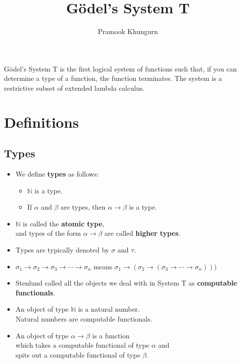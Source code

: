 \documentclass[10pt]{article}
\title{G\"odel's System T}
\author{Pramook Khungurn}
\begin{document}
	\maketitle
	
	G\"odel's System T is the first logical system of functions such that, if you can determine a type of a function,
	the function terminates. The system is a restrictive subset of extended lambda calculus.
	
	\section{Definitions}
	
	\subsection{Types}
	\begin{itemize}
	  \item We define {\bf types} as follows:
	    \begin{itemize}
	      \item $\mathbb{N}$ is a type.
	      \item If $\alpha$ and $\beta$ are types, then $\alpha \rightarrow \beta$ is a type.
	    \end{itemize}
	  
	  \item $\mathbb{N}$ is called the {\bf atomic type},\\
	    and types of the form $\alpha \rightarrow \beta$ are called {\bf higher types}.
	  
	  \item Types are typically denoted by $\sigma$ and $\tau$.
	  
	  \item $\sigma_1 \rightarrow \sigma_2 \rightarrow \sigma_3 \rightarrow \dotsb \rightarrow \sigma_n$
	    means $\sigma_1 \rightarrow (\sigma_2 \rightarrow (\sigma_3 \rightarrow \dotsb \rightarrow \sigma_n ) ) )$
	    
	  \item Stenlund called all the objects we deal with in System T as {\bf computable functionals}.
	  
	  \item An object of type $\mathbb{N}$ is a natural number.\\
	   Natural numbers are computable functionals.
	  
	  \item An object of type $\alpha \rightarrow \beta$ is a function\\ 
	  which takes a computable functional of type $\alpha$ and\\ 
	  spits out a computable functional of type $\beta$.
	\end{itemize}
	
\end{document}

